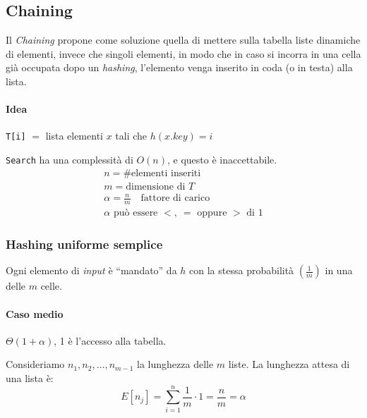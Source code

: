 \subsection{Chaining}\label{hash:chaining}
Il \emph{Chaining} propone come soluzione quella di mettere sulla tabella liste dinamiche
di elementi, invece che singoli elementi, in modo che in caso si incorra in una cella
già occupata dopo un \emph{hashing}, l'elemento venga inserito in coda (o in testa) alla
lista.

\paragraph{Idea} \texttt{T[i]} $=$ lista elementi $x$ tali che $h(x.key) = i$




\texttt{Search} ha una complessità di $O(n)$, e questo è inaccettabile.
\begin{gather*}
	n = \text{\# elementi inseriti} \\
	m = \text{dimensione di } T \\
	\alpha = \frac{n}{m} \quad \text{fattore di carico} \\
	\alpha \text{ può essere }<, \ = \text{ oppure } > \text{ di } 1
\end{gather*}

\subsubsection{Hashing uniforme semplice}
Ogni elemento di \emph{input} è ``mandato'' da $h$ con la stessa probabilità $\left( \frac{1}{m} \right)$
in una delle $m$ celle.

\paragraph{Caso medio} $\Theta(1 + \alpha)$, 1 è l'accesso alla tabella.\par
Consideriamo $n_1,n_2,\dots,n_{m-1}$ la lunghezza delle $m$ liste. La lunghezza attesa
di una lista è:
$$E[n_j] = \displaystyle\sum_{i = 1}^{n} \frac{1}{m} \cdot 1 = \frac{n}{m} = \alpha$$

